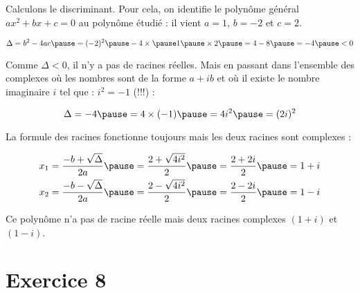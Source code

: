 \documentclass[9pt,professionalfonts,handout,hyperref]{beamer}
\begin{document}
\begin{frame}

Calculons le discriminant. \pause Pour cela, on identifie le polynôme général $ax^{2} + bx +c=0$ au polynôme étudié : \pause il vient $a = 1$, \pause $ b=-2$ \pause et $c=2$.

\[
\Delta = b^2 -4ac \pause = (-2)^2\pause -4\times \pause 1 \pause \times 2 \pause = 4-8 \pause = -4 \pause <0
\]

Comme $\Delta<0$, il n'y a pas de racines réelles. \pause Mais en passant dans l'ensemble des complexes \pause où les nombres sont de la forme $a+ib$ \pause et où il existe le nombre imaginaire $i$ \pause tel que : $i^2=-1$ (!!!) :

\[
\Delta = -4 \pause = 4\times (-1) \pause = 4i^2 \pause = (2i)^2
\]

\pause La formule des racines fonctionne toujours mais les deux racines sont complexes :

\[\begin{aligned}
&x_1 = \frac{-b + \sqrt{\Delta}}{2a} \pause = \frac{2 + \sqrt{4i^2}}{2}\pause = \frac{2 + 2i}{2} \pause = 1+i\\
&x_2 = \frac{-b - \sqrt{\Delta}}{2a} \pause = \frac{2 - \sqrt{4i^2}}{2} \pause = \frac{2 - 2i}{2} \pause = 1-i\\
\end{aligned}\]

\pause Ce polynôme n'a pas de racine réelle \pause mais deux racines complexes $(1+i)$ et $(1-i)$.

\end{frame}

\section{Exercice 8}

%
\end{document}

